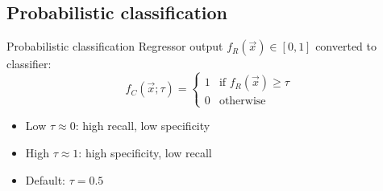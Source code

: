 \subsection{Probabilistic classification}

\begin{frame}{Probabilistic classification}
  Regressor output $f_R(\vec{x}) \in [0, 1]$ converted to classifier:
  \[
    f_C(\vec{x}; \tau) = \begin{cases}
      1 & \text{if } f_R(\vec{x}) \geq \tau \\
      0 & \text{otherwise}
    \end{cases}
  \]

  \vspace{0.3cm}
  \begin{itemize}
    \item Low $\tau \approx 0$: high recall, low specificity
    \item High $\tau \approx 1$: high specificity, low recall
    \item Default: $\tau = 0.5$
  \end{itemize}
\end{frame}

